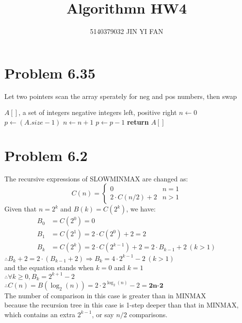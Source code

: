 \documentclass[a4paper]{article}
\title{\textbf{Algorithmn HW4}}
\author{5140379032 JIN YI FAN}
\date{}
\begin{document}
\maketitle
\begin{spacing}{1.3}
\section*{Problem 6.35}
Let two pointers scan the array sperately for neg and pos numbers, then swap
\begin{algorithmic}[1]
\Require $A[]$, a set of integers
\Ensure negative integers left, positive right
\State $n\gets 0$
\State $p\gets (A.size-1)$
\State $n\gets n+1$
\EndWhile
{}
\State $p\gets p-1$
\EndWhile
\State {}
\EndWhile
\State \textbf{return} $A[]$
\end{algorithmic}

\section*{Problem 6.2}
The recursive expressions of SLOWMINMAX are changed as:
$$C(n)=
\begin{cases}
0 & n=1\\
2\cdot C(n/2)+2 & n>1
\end{cases}
$$
Given that $n=2^{k}$ and $B(k)=C(2^{k})$, we have:
\begin{align}
B_0&=C(2^{0})=0\\
B_1&=C(2^{1})=2\cdot C(2^{0})+2=2\\
B_k&=C(2^{k})=2\cdot C(2^{k-1})+2=2\cdot B_{k-1}+2\ (k>1)
\end{align}
$\therefore B_k+2=2\cdot (B_{k-1}+2)\Rightarrow B_k=4\cdot 2^{k-1}-2\ (k>1)$ 
\\and the equation stands when $k=0$ and $k=1$
\\$\therefore \forall k\geq 0, B_k=2^{k+1}-2$
\\$\therefore C(n)=B(\log_2(n))=2\cdot 2^{\log_2(n)}-2=\textbf{2n-2}$
\\The number of comparison in this case is greater than in MINMAX 
\\because the recursion tree in this case is 1-step deeper than that in MINMAX, which contains an extra $2^{k-1}$, or say $n/2$ comparisons.


\end{spacing}
\end{document}
